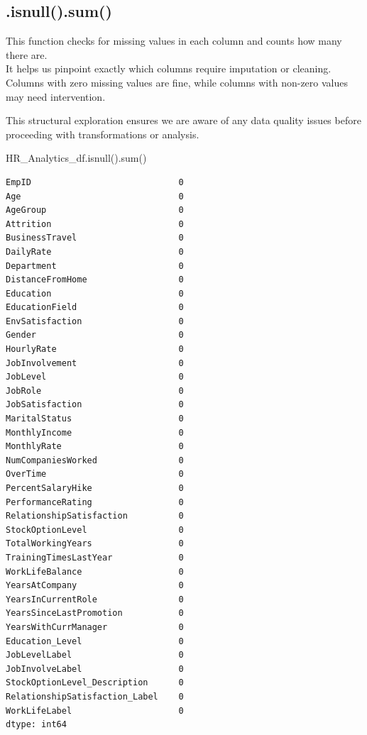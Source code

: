 \documentclass[
  letterpaper,
  DIV=11,
  numbers=noendperiod]{scrartcl}
\newenvironment{Shaded}{\begin{snugshade}}{\end{snugshade}}
\newcommand{\BuiltInTok}[1]{\textcolor[rgb]{0.00,0.23,0.31}{#1}}
\newcommand{\NormalTok}[1]{\textcolor[rgb]{0.00,0.23,0.31}{#1}}
\begin{document}
\subsection{.isnull().sum()}\label{isnull.sum}

This function checks for missing values in each column and counts how
many there are.\\
It helps us pinpoint exactly which columns require imputation or
cleaning.\\
Columns with zero missing values are fine, while columns with non-zero
values may need intervention.

This structural exploration ensures we are aware of any data quality
issues before proceeding with transformations or analysis.

\begin{Shaded}
\begin{Highlighting}[]
\NormalTok{HR\_Analytics\_df.isnull().}\BuiltInTok{sum}\NormalTok{()}
\end{Highlighting}
\end{Shaded}

\begin{verbatim}
EmpID                             0
Age                               0
AgeGroup                          0
Attrition                         0
BusinessTravel                    0
DailyRate                         0
Department                        0
DistanceFromHome                  0
Education                         0
EducationField                    0
EnvSatisfaction                   0
Gender                            0
HourlyRate                        0
JobInvolvement                    0
JobLevel                          0
JobRole                           0
JobSatisfaction                   0
MaritalStatus                     0
MonthlyIncome                     0
MonthlyRate                       0
NumCompaniesWorked                0
OverTime                          0
PercentSalaryHike                 0
PerformanceRating                 0
RelationshipSatisfaction          0
StockOptionLevel                  0
TotalWorkingYears                 0
TrainingTimesLastYear             0
WorkLifeBalance                   0
YearsAtCompany                    0
YearsInCurrentRole                0
YearsSinceLastPromotion           0
YearsWithCurrManager              0
Education_Level                   0
JobLevelLabel                     0
JobInvolveLabel                   0
StockOptionLevel_Description      0
RelationshipSatisfaction_Label    0
WorkLifeLabel                     0
dtype: int64
\end{verbatim}
\end{document}
